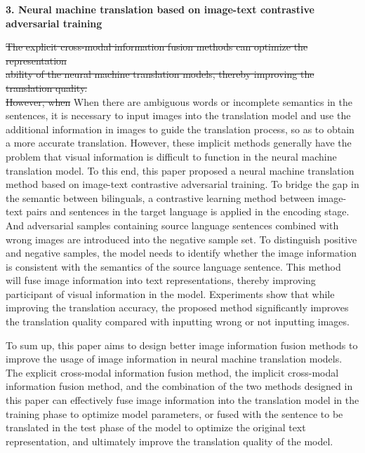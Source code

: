 \textbf{3. Neural machine translation based on image-text contrastive adversarial training}

\sout{The explicit cross-modal information fusion methods can optimize the representation} \\ \sout{ability of the neural machine translation models, thereby improving the translation quality.} \\ \sout{However, when} When there are ambiguous words or incomplete semantics in the sentences, it is necessary to input images into the translation model and use the additional information in images to guide the translation process, so as to obtain a more accurate translation. However, these implicit methods generally have the problem that visual information is difficult to function in the neural machine translation model. To this end, this paper proposed a neural machine translation method based on image-text contrastive adversarial training. To bridge the gap in the semantic between bilinguals, a contrastive learning method between image-text pairs and sentences in the target language is applied in the encoding stage. And adversarial samples containing source language sentences combined with wrong images are introduced into the negative sample set. To distinguish positive and negative samples, the model needs to identify whether the image information is consistent with the semantics of the source language sentence. This method will fuse image information into text representations, thereby improving participant of visual information in the model. Experiments show that while improving the translation accuracy, the proposed method significantly improves the translation quality compared with inputting wrong or not inputting images.

To sum up, this paper aims to design better image information fusion methods to improve the usage of image information in neural machine translation models. The explicit cross-modal information fusion method, the implicit cross-modal information fusion method, and the combination of the two methods designed in this paper can effectively fuse image information into the translation model in the training phase to optimize model parameters, or fused with the sentence to be translated in the test phase of the model to optimize the original text representation, and ultimately improve the translation quality of the model.

